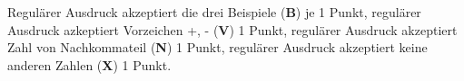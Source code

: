 \begin{bewertung}
Regulärer Ausdruck akzeptiert die drei Beispiele ({\bf B}) je 1 Punkt,
regulärer Ausdruck azkeptiert Vorzeichen +, - ({\bf V}) 1 Punkt,
regulärer Ausdruck akzeptiert Zahl von Nachkommateil ({\bf N}) 1 Punkt,
regulärer Ausdruck akzeptiert keine anderen Zahlen ({\bf X}) 1 Punkt.
\end{bewertung}

